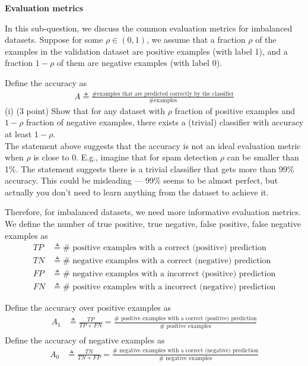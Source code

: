 \item {} \textbf{Evaluation metrics}

In this sub-question, we discuss the common evaluation metrics for imbalanced datasets. Suppose for some $\rho \in (0,1)$, we assume that a fraction $\rho$ of the examples in the validation dataset are positive examples (with label 1), and a fraction $1-\rho$  of them are negative examples (with label 0).


Define the accuracy as
\begin{align*}
A \triangleq %
\frac{\# \textrm{examples that are predicted correctly by the classifier}}{\# \textrm{examples}} 
\end{align*}
(i) (3 point) Show that for any dataset with $\rho$ fraction of positive examples and $1-\rho$ fraction of negative examples, there exists a (trivial) classifier with accuracy at least $1-\rho$. 
\newline
\\
The statement above suggests that the accuracy is not an ideal evaluation metric when $\rho$ is close to 0. E.g., imagine that for spam detection $\rho$ can be smaller than 1\%. The statement suggests there is a trivial classifier that gets more than 99\% accuracy. This could be misleading ---  99\% seems to be almost perfect, but actually you don't need to learn anything from the dataset to achieve it. 

Therefore, for imbalanced datasets, we need more informative evaluation metrics. We define the number of true positive, true negative, false positive, false negative examples as
\begin{align*}
TP & \triangleq \# \textrm{ positive examples with a correct (positive) prediction} \\
TN & \triangleq \# \textrm{ negative examples with a correct (negative) prediction} \\
FP & \triangleq \# \textrm{ negative examples with a incorrect (positive) prediction} \\
FN & \triangleq \# \textrm{ positive examples with a incorrect (negative) prediction} 
\end{align*}

Define the accuracy over positive examples as 
\newcommand{\recall}{\textup{recall}}
\begin{align*}
A_1 &\triangleq \frac{TP}{TP + FN} = \frac{\#  \textrm{ positive examples with a correct (positive) prediction}}{\# \textrm{ positive examples}}\nonumber\\
\end{align*}
Define the accuracy of negative examples as 
\begin{align*}
A_0 & \triangleq \frac{TN}{TN + FP} = \frac{\#  \textrm{ negative examples with a correct (negative) prediction}}{\# \textrm{ negative examples}}
\end{align*}

